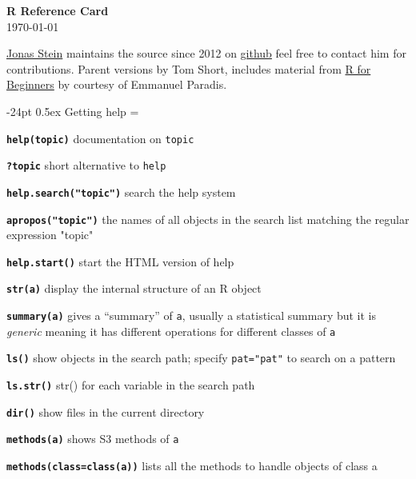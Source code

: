 \documentclass[10pt,landscape]{article}
\makeatletter
\renewcommand\section{\@startsection{section}{1}{0mm}%
                                     {-24pt}%
                                     {0.5ex}%
                                {\color{blue}\normalfont\large\bfseries}}
\newcommand{\code}{\texttt}
\newcommand{\bcode}[1]{\texttt{\textbf{#1}}}
\makeatother
\begin{document}
\footnotesize
\begin{multicols*}{3}

\setlength{\premulticols}{1pt}
\setlength{\postmulticols}{1pt}
\setlength{\multicolsep}{1pt}
\setlength{\columnsep}{2pt}

\begin{center}
     {\Large{\textbf{\color{blue}R Reference Card}}} \\
 \today
\end{center}
\href{mailto:news@jonasstein.de}{Jonas Stein} maintains 
the source since 2012 on \href{https://github.com/jonasstein/R-Reference-Card}{github} feel free to contact him for contributions.
Parent versions by Tom Short, includes material from 
\href{http://cran.r-project.org/doc/contrib/Paradis-rdebuts_en.pdf}{R for Beginners} 
by courtesy of Emmanuel Paradis.



\section{Getting help}
\everypar={\hangindent=9mm}

\bcode{help(topic)} documentation on \code{topic} 

\bcode{?topic} short alternative to \code{help}

\bcode{help.search("topic")} search the help system 

\bcode{apropos("topic")} the names of all objects in the search list
matching the regular expression "topic"

\bcode{help.start()} start the HTML version of help

\bcode{str(a)} display the internal structure of an R object

\bcode{summary(a)} gives a ``summary'' of \code{a}, usually a
statistical summary but it is \emph{generic} meaning it has different operations for different
classes of \code{a}

\bcode{ls()} show objects in the search path; specify \code{pat="pat"}
to search on a pattern

\bcode{ls.str()} str() for each variable in the search path

\bcode{dir()} show files in the current directory

\bcode{methods(a)} shows S3 methods of \code{a}

\bcode{methods(class=class(a))} lists all the methods to handle objects
of class a





\end{multicols*}
\end{document}
